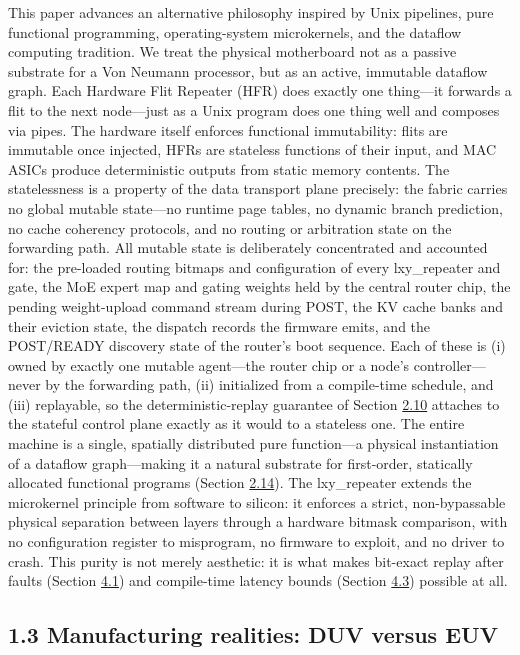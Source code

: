 \documentclass[10pt,twocolumn]{article}
\begin{document}
This paper advances an alternative philosophy inspired by Unix pipelines\cite{7}, pure functional programming\cite{6}, operating-system microkernels\cite{8}, and the dataflow computing tradition\cite{11,12}. We treat the physical motherboard not as a passive substrate for a Von Neumann processor, but as an active, immutable dataflow graph. Each Hardware Flit Repeater (HFR) does exactly one thing---it forwards a flit to the next node---just as a Unix program does one thing well and composes via pipes. The hardware itself enforces functional immutability: flits are immutable once injected, HFRs are stateless functions of their input, and MAC ASICs produce deterministic outputs from static memory contents. The statelessness is a property of the data transport plane precisely: the fabric carries no global mutable state---no runtime page tables, no dynamic branch prediction, no cache coherency protocols, and no routing or arbitration state on the forwarding path. All mutable state is deliberately concentrated and accounted for: the pre-loaded routing bitmaps and configuration of every lxy\_repeater and gate, the MoE expert map and gating weights held by the central router chip, the pending weight-upload command stream during POST, the KV cache banks and their eviction state, the dispatch records the firmware emits, and the POST/READY discovery state of the router's boot sequence. Each of these is (i) owned by exactly one mutable agent---the router chip or a node's controller---never by the forwarding path, (ii) initialized from a compile-time schedule, and (iii) replayable, so the deterministic-replay guarantee of Section \hyperref[sec:2.10]{2.10} attaches to the stateful control plane exactly as it would to a stateless one. The entire machine is a single, spatially distributed pure function---a physical instantiation of a dataflow graph---making it a natural substrate for first-order, statically allocated functional programs (Section \hyperref[sec:2.14]{2.14}). The lxy\_repeater extends the microkernel principle from software to silicon: it enforces a strict, non-bypassable physical separation between layers through a hardware bitmask comparison, with no configuration register to misprogram, no firmware to exploit, and no driver to crash\cite{9}. This purity is not merely aesthetic: it is what makes bit-exact replay after faults (Section \hyperref[sec:4.1]{4.1}) and compile-time latency bounds (Section \hyperref[sec:4.3]{4.3}) possible at all.

\subsection*{1.3 Manufacturing realities: DUV versus EUV}\label{sec:1.3}
\end{document}
